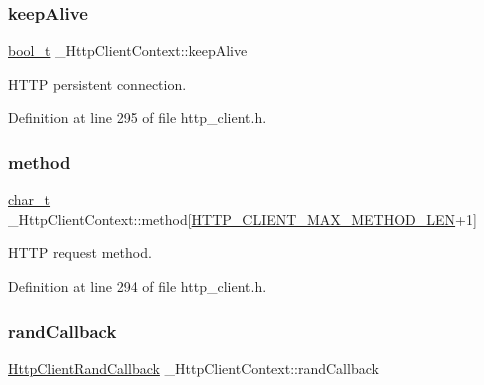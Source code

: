 \mbox{\label{struct__HttpClientContext_a523ae58fe9bb9dc8bbbc7b398d9efb0b}} 
\subsubsection{\texorpdfstring{keep\+Alive}{keepAlive}}
{\footnotesize\ttfamily \hyperlink{compiler__port_8h_a812d16e5494522586b3784e55d479912}{bool\+\_\+t} \+\_\+\+Http\+Client\+Context\+::keep\+Alive}



H\+T\+TP persistent connection. 



Definition at line 295 of file http\+\_\+client.\+h.

\mbox{\label{struct__HttpClientContext_a1fcb8ff4c2d18522ea680674d0762bd9}} 
\subsubsection{\texorpdfstring{method}{method}}
{\footnotesize\ttfamily \hyperlink{compiler__port_8h_a40bb5262bf908c328fbcfbe5d29d0201}{char\+\_\+t} \+\_\+\+Http\+Client\+Context\+::method\mbox{[}\hyperlink{http__client_8h_a2d6a6200e93ddfc7b7e32cfe0099dd3d}{H\+T\+T\+P\+\_\+\+C\+L\+I\+E\+N\+T\+\_\+\+M\+A\+X\+\_\+\+M\+E\+T\+H\+O\+D\+\_\+\+L\+EN}+1\mbox{]}}



H\+T\+TP request method. 



Definition at line 294 of file http\+\_\+client.\+h.

\mbox{\label{struct__HttpClientContext_aa366e8766dd1ec821f48fda32dd550eb}} 
\subsubsection{\texorpdfstring{rand\+Callback}{randCallback}}
{\footnotesize\ttfamily \hyperlink{http__client_8h_a034d564bf21de50a08d13ea832881ec0}{Http\+Client\+Rand\+Callback} \+\_\+\+Http\+Client\+Context\+::rand\+Callback}



